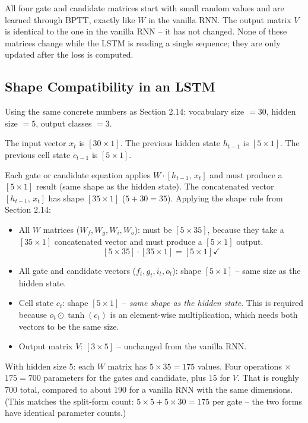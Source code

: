 \documentclass[12pt,a4paper]{article}
\begin{document}
All four gate and candidate matrices start with small random values and are learned
through BPTT, exactly like $W$ in the vanilla RNN. The output matrix $V$ is
identical to the one in the vanilla RNN -- it has not changed. None of these matrices
change while the LSTM is reading a single sequence; they are only updated after the
loss is computed.

\subsection{Shape Compatibility in an LSTM}

Using the same concrete numbers as Section 2.14: vocabulary size $= 30$, hidden
size $= 5$, output classes $= 3$.

The input vector $x_t$ is $[30 \times 1]$. The previous hidden state $h_{t-1}$ is
$[5 \times 1]$. The previous cell state $c_{t-1}$ is $[5 \times 1]$.

Each gate or candidate equation applies $W \cdot [h_{t-1},\, x_t]$ and must produce
a $[5 \times 1]$ result (same shape as the hidden state). The concatenated vector
$[h_{t-1},\, x_t]$ has shape $[35 \times 1]$ ($5 + 30 = 35$). Applying the shape
rule from Section 2.14:

\begin{itemize}
    \item All $W$ matrices ($W_f, W_g, W_i, W_o$): must be $[5 \times 35]$, because
    they take a $[35 \times 1]$ concatenated vector and must produce a $[5 \times 1]$
    output.
    \[
    [5 \times 35] \cdot [35 \times 1] = [5 \times 1] \checkmark
    \]
    \item All gate and candidate vectors ($f_t, g_t, i_t, o_t$): shape $[5 \times 1]$
    -- same size as the hidden state.
    \item Cell state $c_t$: shape $[5 \times 1]$ -- \textit{same shape as the hidden
    state}. This is required because $o_t \odot \tanh(c_t)$ is an element-wise
    multiplication, which needs both vectors to be the same size.
    \item Output matrix $V$: $[3 \times 5]$ -- unchanged from the vanilla RNN.
\end{itemize}

With hidden size 5: each $W$ matrix has $5 \times 35 = 175$ values. Four operations
$\times$ $175 = 700$ parameters for the gates and candidate, plus $15$ for $V$. That
is roughly $700$ total, compared to about $190$ for a vanilla RNN with the same
dimensions. (This matches the split-form count: $5{\times}5 + 5{\times}30 = 175$ per
gate -- the two forms have identical parameter counts.)
\end{document}
